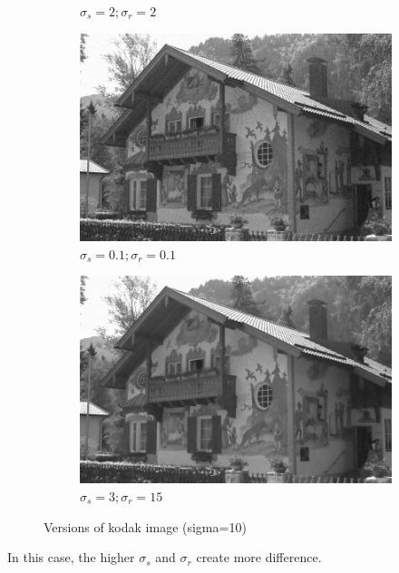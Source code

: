 \documentclass[12pt]{article}
\begin{document}
\begin{figure}[h]
\begin{subfigure}[b]{0.24\textwidth}
        \caption{$\sigma_s=2;\sigma_r=2$}
        \label{fig:subfig2}
    \end{subfigure}
    \begin{subfigure}[b]{0.24\textwidth}
        \centering
        \includegraphics[width=\textwidth]{../images/filtered_kodak_10_sigma_s_0.1_sigma_r_0.1.png}
        \caption{$\sigma_s=0.1;\sigma_r=0.1$}
        \label{fig:subfig3}
    \end{subfigure}
    \begin{subfigure}[b]{0.24\textwidth}
        \centering
        \includegraphics[width=\textwidth]{../images/filtered_kodak_10_sigma_s_3_sigma_r_15.png}
        \caption{$\sigma_s=3;\sigma_r=15$}
        \label{fig:subfig3}
    \end{subfigure}
    
    \caption{Versions of kodak image (sigma=10)}
    \label{fig:overall}
\end{figure}


In this case, the higher $\sigma_s$ and $\sigma_r$ create more difference.
\end{document}
